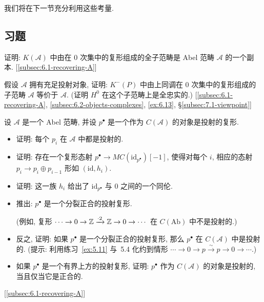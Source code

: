 我们将在下一节充分利用这些考量.

\subsection*{习题}
{}

\begin{prob}\label{ex:6.1}
证明: $K(\mathcal{A})$ 中由在 $0$ 次集中的复形组成的全子范畴是 Abel 范畴 $\mathcal{A}$ 的一个副本. [\ref{subsec:6.1-recovering-A}]
\end{prob}

\begin{prob}\label{ex:6.2}
假设 $\mathcal{A}$ 拥有充足投射对象, 证明: $K^{-}(P)$ 中由上同调在 $0$ 次集中的复形组成的子范畴 $\mathcal{A}$ 等价于 $\mathcal{A}$. (证明 $H^0$ 在这个子范畴上是全忠实的.) [\ref{subsec:6.1-recovering-A}, \ref{subsec:6.2-objects-complexes}, \ref{ex:6.13}, \S\ref{subsec:7.1-viewpoint}]
\end{prob}

\begin{prob}\label{ex:6.3}
设 $\mathcal{A}$ 是一个 Abel 范畴, 并设 $p^\bullet$ 是一个作为 $C(\mathcal{A})$ 的对象是投射的复形.
\begin{itemize}
\item 证明: 每个 $p_i$ 在 $\mathcal{A}$ 中都是投射的.
\item 证明: 存在一个复形态射 $p^\bullet\to MC(\mathrm{id}_{p^\bullet})[-1]$, 使得对每个 $i$, 相应的态射 $p_i\to p_i\oplus p_{i-1}$ 形如 $(\mathrm{id},h_i)$.
\item 证明: 这一族 $h_i$ 给出了 $\mathrm{id}_{p^\bullet}$ 与 $0$ 之间的一个同伦.
\item 推出: $p^\bullet$ 是一个分裂正合的投射复形.

(例如, 复形 $\cdots\to 0\to\mathbb{Z}\xrightarrow{\cdot 2}\mathbb{Z}\to 0\to\cdots$ 在 $C(\mathrm{Ab})$ 中不是投射的.)

\item 反之, 证明: 如果 $p^\bullet$ 是一个分裂正合的投射复形, 那么 $p^\bullet$ 在 $C(\mathcal{A})$ 中是投射的. (提示: 利用练习~\ref{ex:5.11} 与~5.4 化约到情形 $\cdots\to 0\to p\xrightarrow{\sim}p\to 0\to\cdots$.)
\item 如果 $p^\bullet$ 是一个有界上方的投射复形, 证明: $p^\bullet$ 作为 $C(\mathcal{A})$ 的对象是投射的, 当且仅当它是正合的.
\end{itemize}
[\ref{subsec:6.1-recovering-A}]
\end{prob}

